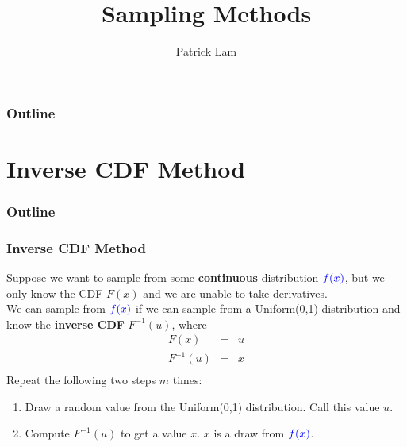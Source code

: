 \documentclass[handout]{beamer}
\author{Patrick Lam}
\title{Sampling Methods}
\date{}
\begin{document}
\newcommand{\red}{\textcolor{red}}
\newcommand{\blue}{\textcolor{blue}}
\newcommand{\purple}{\textcolor{purple}}

\frame{\titlepage}

\begin{frame}
\frametitle{Outline}
\tableofcontents
\end{frame}


\section{Inverse CDF Method}

\begin{frame}
\frametitle{Outline}
\tableofcontents[currentsection]
\end{frame}

\begin{frame}
\frametitle{Inverse CDF Method}
\pause
Suppose we want to sample from some \textbf{continuous} distribution
$\blue{f(x)}$, but we only know the CDF $F(x)$ and we are unable to
take derivatives.  \\
\pause
\bigskip
We can sample from $\blue{f(x)}$ if we can sample from a Uniform(0,1)
distribution and know the \textbf{inverse CDF} $F^{-1}(u)$, \pause where
\begin{eqnarray*}
F(x) &=& u\\
F^{-1}(u) &=& x\\
\end{eqnarray*}
\pause
Repeat the following two steps $m$ times:
\pause
\begin{enumerate}
\item Draw a random value from the Uniform(0,1)
distribution. Call this value $u$.
\pause
\item Compute $F^{-1}(u)$ to get a value $x$.  $x$ is a
draw from $\blue{f(x)}$.
\end{enumerate}
\end{frame}
\end{document}
